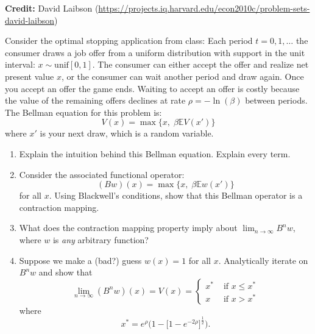 \documentclass[11pt]{extarticle}
\theoremstyle{plain}
\theoremstyle{definition}
\begin{document}
\textbf{Credit:} David Laibson (\url{https://projects.iq.harvard.edu/econ2010c/problem-sets-david-laibson})

\vspace{5mm}
\noindent
Consider the optimal stopping application from class: Each period $t = 0, 1, \ldots$ the consumer draws a job offer from a uniform distribution with support in the unit interval: $x \sim \text{unif}[0, 1]$. The consumer can either accept the offer and realize net present value $x$, or the consumer can wait another period and draw again. Once you accept an offer the game ends. Waiting to accept an offer is costly because the value of the remaining offers declines at rate $\rho = - \ln(\beta)$ between periods. The Bellman equation for this problem is:
\begin{equation*}
	V(x) = \max \bigg\{ x, \; \beta \mathbb E V(x') \bigg\}
\end{equation*}
where $x'$ is your next draw, which is a random variable.


\vspace{5mm}
\begin{enumerate}
\item Explain the intuition behind this Bellman equation. Explain every term.

\item Consider the associated functional operator:
\begin{equation*}
	(Bw)(x) = \max \bigg\{ x, \; \beta \mathbb E w(x') \bigg\}
\end{equation*}
for all $x$. Using Blackwell's conditions, show that this Bellman operator is a contraction mapping. 

\item What does the contraction mapping property imply about $\lim_{n \to \infty} B^n w$, where $w$ is \textit{any} arbitrary function? 

\item Suppose we make a (bad?) guess $w(x) = 1$ for all $x$. Analytically iterate on $B^n w$ and show that 
\begin{equation*}
	\lim_{n \to \infty} (B^n w) (x) = V(x) = \begin{cases}
		x^* & \text { if } x \leq x^* \\
		x & \text { if } x > x^*
	\end{cases}
\end{equation*}
where
\begin{equation*}
	x^* = e^\rho \bigg( 1 - \Big[ 1 - e^{- 2 \rho} \Big]^\frac{1}{2} \bigg).
\end{equation*}
\end{enumerate}
\end{document}
